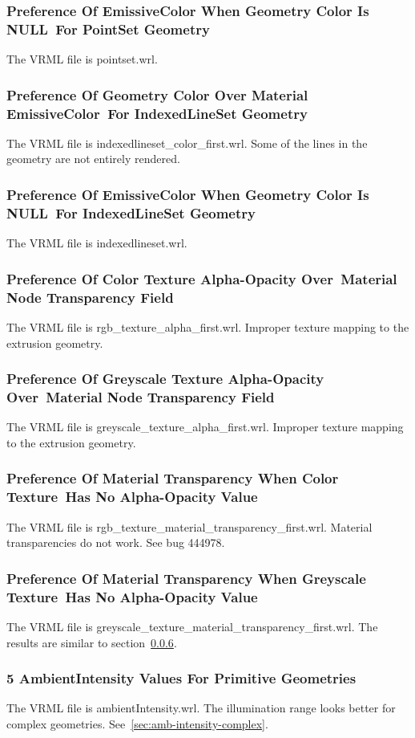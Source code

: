 \documentclass[12pt,letterpaper]{article}
\newcommand{\MatOa}{Preference Of EmissiveColor When Geometry Color Is NULL~}
\newcommand{\MatOb}{For PointSet Geometry}
\newcommand{\MatPa}{Preference Of Geometry Color Over Material EmissiveColor~}
\newcommand{\MatPb}{For IndexedLineSet Geometry}
\newcommand{\MatQa}{Preference Of EmissiveColor When Geometry Color Is NULL~}
\newcommand{\MatQb}{For IndexedLineSet Geometry}
\newcommand{\MatRa}{Preference Of Color Texture Alpha-Opacity Over~}
\newcommand{\MatRb}{Material Node Transparency Field}
\newcommand{\MatSa}{Preference Of Greyscale Texture Alpha-Opacity Over~}
\newcommand{\MatSb}{Material Node Transparency Field}
\newcommand{\MatTa}{Preference Of Material Transparency When Color Texture~}
\newcommand{\MatTb}{Has No Alpha-Opacity Value}
\newcommand{\MatUa}{Preference Of Material Transparency When Greyscale Texture~}
\newcommand{\MatUb}{Has No Alpha-Opacity Value}
\newcommand{\MatV}{5 AmbientIntensity Values For Primitive Geometries}
\begin{document}
\subsubsection{\MatOa\MatOb}
The VRML file is pointset.wrl.

\subsubsection{\MatPa\MatPb}
The VRML file is indexedlineset\_color\_first.wrl.\newline
Some of the lines in the geometry are not entirely rendered.

\subsubsection{\MatQa\MatQb}
The VRML file is indexedlineset.wrl.

\subsubsection{\MatRa\MatRb}
The VRML file is rgb\_texture\_alpha\_first.wrl.\newline
Improper texture mapping to the extrusion geometry.

\subsubsection{\MatSa\MatSb}
The VRML file is greyscale\_texture\_alpha\_first.wrl.\newline
Improper texture mapping to the extrusion geometry.

\subsubsection{\MatTa\MatTb}
\label{sec:rgb-texture-mat-transparency}
The VRML file is rgb\_texture\_material\_transparency\_first.wrl.\newline
Material transparencies do not work.
See bug 444978.

\subsubsection{\MatUa\MatUb}
The VRML file is greyscale\_texture\_material\_transparency\_first.wrl.\newline
The results are similar to section~\ref{sec:rgb-texture-mat-transparency}.

\subsubsection{\MatV}
The VRML file is ambientIntensity.wrl.\newline
The illumination range looks better for complex geometries.
See~\ref{sec:amb-intensity-complex}.
\end{document}
